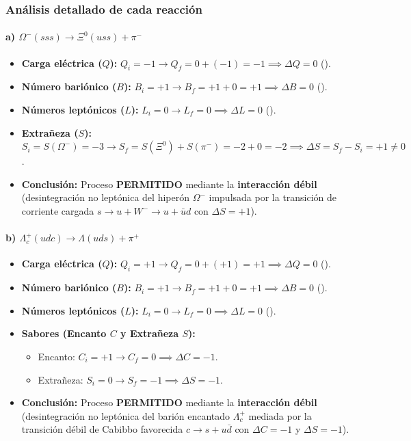\begin{problema}
\subsubsection*{Análisis detallado de cada reacción}

\paragraph{a) $\Omega^- (sss) \longrightarrow \Xi^0 (uss) + \pi^-$}
\begin{itemize}
    \item \textbf{Carga eléctrica ($Q$):} $Q_i = -1 \to Q_f = 0 + (-1) = -1 \implies \Delta Q = 0$ (\checkmark).
    \item \textbf{Número bariónico ($B$):} $B_i = +1 \to B_f = +1 + 0 = +1 \implies \Delta B = 0$ (\checkmark).
    \item \textbf{Números leptónicos ($L$):} $L_i = 0 \to L_f = 0 \implies \Delta L = 0$ (\checkmark).
    \item \textbf{Extrañeza ($S$):} $S_i = S(\Omega^-) = -3 \to S_f = S(\Xi^0) + S(\pi^-) = -2 + 0 = -2 \implies \Delta S = S_f - S_i = +1 \neq 0$.
    \item \textbf{Conclusión:} Proceso \textbf{PERMITIDO} mediante la \textbf{interacción débil} (desintegración no leptónica del hiperón $\Omega^-$ impulsada por la transición de corriente cargada $s \to u + W^- \to u + \bar{u}d$ con $\Delta S = +1$).
\end{itemize}

\paragraph{b) $\Lambda_c^+ (udc) \longrightarrow \Lambda (uds) + \pi^+$}
\begin{itemize}
    \item \textbf{Carga eléctrica ($Q$):} $Q_i = +1 \to Q_f = 0 + (+1) = +1 \implies \Delta Q = 0$ (\checkmark).
    \item \textbf{Número bariónico ($B$):} $B_i = +1 \to B_f = +1 + 0 = +1 \implies \Delta B = 0$ (\checkmark).
    \item \textbf{Números leptónicos ($L$):} $L_i = 0 \to L_f = 0 \implies \Delta L = 0$ (\checkmark).
    \item \textbf{Sabores (Encanto $C$ y Extrañeza $S$):}
    \begin{itemize}
        \item Encanto: $C_i = +1 \to C_f = 0 \implies \Delta C = -1$.
        \item Extrañeza: $S_i = 0 \to S_f = -1 \implies \Delta S = -1$.
    \end{itemize}
    \item \textbf{Conclusión:} Proceso \textbf{PERMITIDO} mediante la \textbf{interacción débil} (desintegración no leptónica del barión encantado $\Lambda_c^+$ mediada por la transición débil de Cabibbo favorecida $c \to s + u\bar{d}$ con $\Delta C = -1$ y $\Delta S = -1$).
\end{itemize}


\end{problema}
